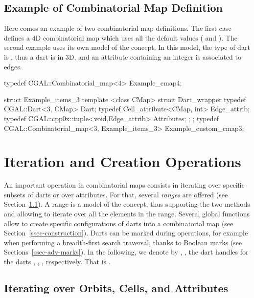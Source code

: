 \subsection{Example of Combinatorial Map Definition}\label{ssec-example-def}

Here comes an example of two combinatorial map definitions.  The first
case  defines a 4D combinatorial map which uses all
the default values ( and
). The second example
 uses its own model of the
 concept. In this model, the type
of dart is , thus a dart is in 3D, and an
attribute containing an integer is associated to edges.

\begin{ccExampleCode}
typedef CGAL::Combinatorial_map<4> Example_cmap4;

struct Example_items_3
{
   template <class CMap>
   struct Dart_wrapper
   {
     typedef CGAL::Dart<3, CMap> Dart;
     typedef Cell_attribute<CMap, int> Edge_attrib;
     typedef CGAL::cpp0x::tuple<void,Edge_attrib> Attributes;
   };
};
typedef CGAL::Combinatorial_map<3, Example_items_3> Example_custom_cmap3;
\end{ccExampleCode}


\section{Iteration and Creation Operations}

An important operation in combinatorial maps consists in iterating
over specific subsets of darts or over attributes. For that, several
\emph{ranges} are offered (see Section~\ref{ssec-range}).  A range is
a model of the  concept, thus supporting the two methods
 and  allowing to iterate over all the
elements in the range.  Several global functions allow to create
specific configurations of darts into a combinatorial map (see
Section~\ref{ssec-construction}).  Darts can be marked during
operations, for example when performing a breadth-first search
traversal, thanks to Boolean marks (see
Sections~\ref{ssec-adv-marks}).  In the following, we denote by
, ,  the dart handles for the darts
, , , respectively. That is .

\subsection{Iterating over Orbits, Cells, and Attributes}\label{ssec-range}

